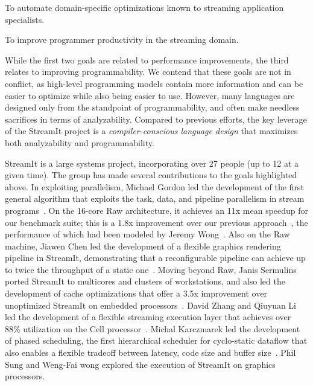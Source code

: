 \item To automate domain-specific optimizations known to streaming
  application specialists.

\item To improve programmer productivity in the streaming domain.

\myend

While the first two goals are related to performance improvements, the
third relates to improving programmability.  We contend that these
goals are not in conflict, as high-level programming models contain
more information and can be easier to optimize while also being easier
to use.  However, many languages are designed only from the standpoint
of programmability, and often make needless sacrifices in terms of
analyzability.  Compared to previous efforts, the key leverage of the
StreamIt project is a {\it compiler-conscious language design} that
maximizes both analyzability and programmability.


StreamIt is a large systems project, incorporating over 27 people (up
to 12 at a given time).  The group has made several contributions to
the goals highlighted above.  In exploiting parallelism, Michael
Gordon led the development of the first general algorithm that
exploits the task, data, and pipeline parallelism in stream
programs~\cite{gordon-asplos06}.  On the 16-core Raw architecture, it
achieves an 11x mean speedup for our benchmark suite; this is a 1.8x
improvement over our previous
approach~\cite{gordon-asplos02,gordon-thesis}, the performance of
which had been modeled by Jeremy Wong~\cite{wong-thesis}.  Also on the
Raw machine, Jiawen Chen led the development of a flexible graphics
rendering pipeline in StreamIt, demonstrating that a reconfigurable
pipeline can achieve up to twice the throughput of a static
one~\cite{chen-graphics05,chen_load-balanced_2005}.  Moving beyond
Raw, Janis Sermulins ported StreamIt to multicores and clusters of
workstations, and also led the development of cache optimizations that
offer a 3.5x improvement over unoptimized StreamIt on embedded
processors~\cite{sermulins-lctes05,sermulins-thesis}.  David Zhang and
Qiuyuan Li led the development of a flexible streaming execution layer
that achieves over 88\% utilization on the Cell
processor~\cite{zhang_lightweight_2007,zhang-thesis}.  Michal
Karczmarek led the development of phased scheduling, the first
hierarchical scheduler for cyclo-static dataflow that also enables a
flexible tradeoff between latency, code size and buffer
size~\cite{karczmarek-lctes03,karczma-thesis}.  Phil Sung and Weng-Fai
wong explored the execution of StreamIt on graphics processors.

